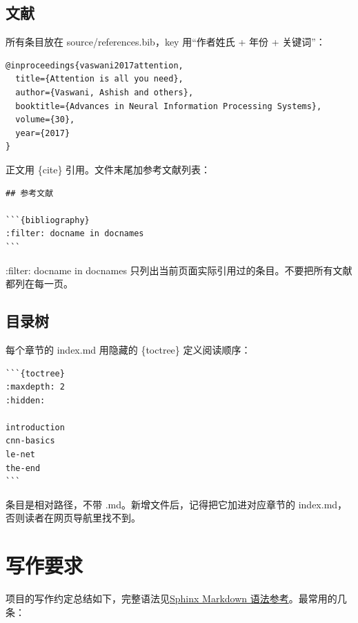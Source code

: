 \documentclass[UTF8,fontset=none,a4paper,11pt]{ctexart}
\newcommand{\code}[1]{{\CJKsetecglue{}\ttfamily #1}}
\begin{document}
\subsection{文献}\label{sec:bibliography-syntax}

所有条目放在 \code{source/references.bib}，key 用“作者姓氏 + 年份 + 关键词”：

\begin{lstlisting}
@inproceedings{vaswani2017attention,
  title={Attention is all you need},
  author={Vaswani, Ashish and others},
  booktitle={Advances in Neural Information Processing Systems},
  volume={30},
  year={2017}
}
\end{lstlisting}

正文用 \code{\{cite\}} 引用。文件末尾加参考文献列表：

\begin{lstlisting}
## 参考文献

```{bibliography}
:filter: docname in docnames
```
\end{lstlisting}

\code{:filter: docname in docnames} 只列出当前页面实际引用过的条目。不要把所有文献都列在每一页。

\subsection{目录树}\label{sec:toctree-syntax}

每个章节的 \code{index.md} 用隐藏的 \code{\{toctree\}} 定义阅读顺序：

\begin{lstlisting}
```{toctree}
:maxdepth: 2
:hidden:

introduction
cnn-basics
le-net
the-end
```
\end{lstlisting}

条目是相对路径，不带 \code{.md}。新增文件后，记得把它加进对应章节的 \code{index.md}，否则读者在网页导航里找不到。

\section{写作要求}\label{sec:writing-rules}

项目的写作约定总结如下，完整语法见\href{https://github.com/ulink-deep-learning-club/ulink-deeplearningclub-handouts/blob/main/source/appendix/sphinx-guide/index.md}{Sphinx Markdown 语法参考}。最常用的几条：
\end{document}

